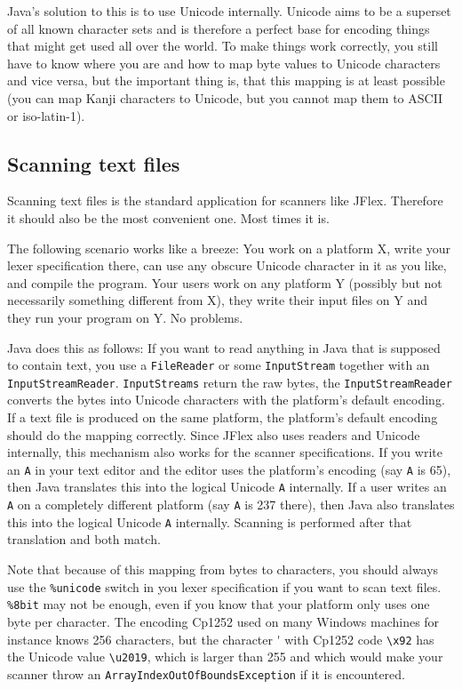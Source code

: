 \documentclass[11pt]{scrartcl}
\begin{document}
Java's solution to this is to use Unicode internally.  Unicode aims to
be a superset of all known character sets and is therefore a perfect base
for encoding things that might get used all over the world. To make
things work correctly, you still have to know where you are and how to
map byte values to Unicode characters and vice versa, but the
important thing is, that this mapping is at least possible (you can
map Kanji characters to Unicode, but you cannot map them to ASCII or
iso-latin-1).

\subsection{Scanning text files}\label{sec:howtotext}

Scanning text files is the standard application for scanners like
JFlex. Therefore it should also be the most convenient one. Most times 
it is.

The following scenario works like a breeze:
You work on a platform X, write your lexer specification there, can
use any obscure Unicode character in it as you like, and compile the
program. Your users work on any platform Y (possibly but not 
necessarily something different from X), they write their input files
on Y and they run your program on Y. No problems.

Java does this as follows:
If you want to read anything in Java that is supposed to contain text, 
you use a \texttt{FileReader} or some \texttt{InputStream} together with
an \texttt{InputStreamReader}. \texttt{InputStreams} return the raw bytes, the 
\texttt{InputStreamReader} converts the bytes into Unicode characters with
the platform's default encoding. If a text file is produced on the
same platform, the platform's default encoding should do the mapping
correctly. Since JFlex also uses readers and Unicode internally, this
mechanism also works for the scanner specifications. If you write an
\texttt{A} in your text editor and the editor uses the platform's encoding (say \texttt{A} is 65), 
then Java translates this into the logical Unicode \texttt{A} internally. 
If a user writes an \texttt{A} on a completely different platform (say \texttt{A} is 237 there),
then Java also translates this into the logical Unicode \texttt{A} internally. Scanning
is performed after that translation and both match.

Note that because of this mapping from bytes to characters, you should always 
use the \texttt{\%unicode} switch in you lexer specification if you want to scan
text files. \texttt{\%8bit} may not be enough, even if
you know that your platform only uses one byte per character. The encoding
Cp1252 used on many Windows machines for instance knows 256 characters, but
the character {\'{}} with Cp1252 code \verb+\x92+ has the Unicode value \verb+\u2019+, which
is larger than 255 and which would make your scanner throw an 
\texttt{ArrayIndexOutOfBoundsException} if it is encountered.
\end{document}
